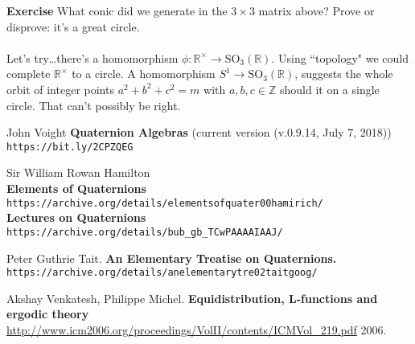 \documentclass[12pt]{article}
\begin{document}
\textbf{Exercise} What conic did we generate in the $3 \times 3$ matrix above?  Prove or disprove: it's a great circle. \\ \\
Let's try\dots there's a homomorphism $\phi: \mathbb{R}^\times \to \text{SO}_3(\mathbb{R})$. Using ``topology" we could complete $\mathbb{R}^\times$ to a circle. A homomorphism $S^1 \to \text{SO}_3(\mathbb{R})$, suggests the whole orbit of integer points $a^2 + b^2 + c^2 = m$ with $a,b,c \in \mathbb{Z}$ should it on a single circle.  That can't possibly be right.
\vfill
\begin{thebibliography}{} 

\item John Voight \textbf{Quaternion Algebras} (current version (v.0.9.14, July 7, 2018)) \texttt{https://bit.ly/2CPZQEG}
\item Sir William Rowan Hamilton \\ 
\textbf{Elements of Quaternions} \texttt{https://archive.org/details/elementsofquater00hamirich/} \\
\textbf{Lectures on Quaternions} \texttt{https://archive.org/details/bub\_{}gb\_{}TCwPAAAAIAAJ/}
\item Peter Guthrie Tait. \textbf{An Elementary Treatise on Quaternions.} \\ \texttt{https://archive.org/details/anelementarytre02taitgoog/} 
\item Akshay Venkatesh, Philippe Michel.  
\textbf{Equidistribution, L-functions and ergodic theory}  \\
\url{http://www.icm2006.org/proceedings/VolII/contents/ICMVol_219.pdf} 2006.
 
\end{thebibliography}
\end{document}
